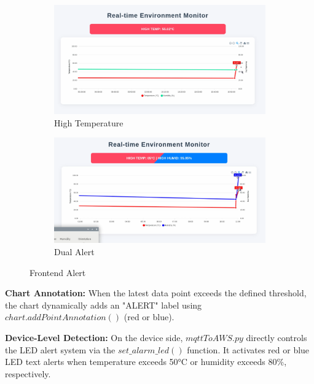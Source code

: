 \documentclass[12pt,a4paper]{article}
\begin{document}
\begin{figure}[h!]
  \begin{subfigure}[b]{0.46\textwidth}
      \includegraphics[width=\textwidth]{figures/3.png}
      \caption{High Temperature}
      \label{fig:sub3}
  \end{subfigure}
  \hfill
  \begin{subfigure}[b]{0.46\textwidth}
      \includegraphics[width=\textwidth]{figures/4.png}
      \caption{Dual Alert}
      \label{fig:sub4}
  \end{subfigure}
  
  \caption{Frontend Alert}
  \label{fig:allplots}
\end{figure}


\vspace{\baselineskip}
\noindent
\textbf{Chart Annotation:} When the latest data point exceeds the defined threshold, the chart dynamically adds an "ALERT" label using $chart.addPointAnnotation()$ (red or blue).

\vspace{\baselineskip}
\noindent
\textbf{Device-Level Detection:} On the device side, $mqttToAWS.py$ directly controls the LED alert system via the $set\_alarm\_led()$ function. It activates red or blue LED text alerts when temperature exceeds 50°C or humidity exceeds 80\%, respectively.
\end{document}
